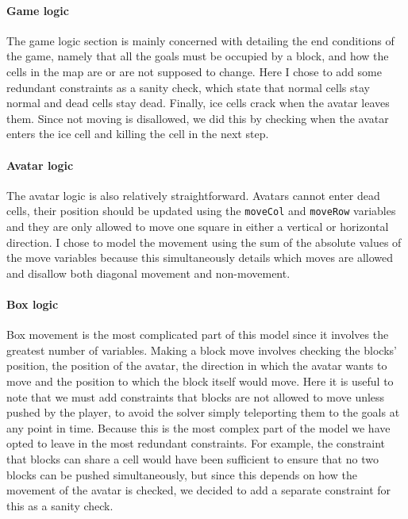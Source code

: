 \documentclass[british]{article}
\newcommand{\code}[1]{\texttt{#1}}
\begin{document}
	\paragraph{Game logic} The game logic section is mainly concerned with detailing the end conditions of the game, namely that all the goals must be occupied by a block, and how the cells in the map are or are not supposed to change. Here I chose to add some redundant constraints  as a sanity check, which state that normal cells stay normal and dead cells stay dead. Finally, ice cells crack when the avatar leaves them. Since not moving is disallowed, we did this by checking when the avatar enters the ice cell and killing the cell in the next step.
	
	\paragraph{Avatar logic} The avatar logic is also relatively straightforward. Avatars cannot enter dead cells, their position should be updated using the \code{moveCol} and \code{moveRow} variables and they are only allowed to move one square in either a vertical or horizontal direction. I chose to model the movement using the sum of the absolute values of the move variables because this simultaneously details which moves are allowed and disallow both diagonal movement and non-movement. 
	
	\paragraph{Box logic} Box movement is the most complicated part of this model since it involves the greatest number of variables. Making a block move involves checking the blocks' position, the position of the avatar, the direction in which the avatar wants to move and the position to which the block itself would move. Here it is useful to note that we must add constraints that blocks are not allowed to move unless pushed by the player, to avoid the solver simply teleporting them to the goals at any point in time. Because this is the most complex part of the model we have opted to leave in the most redundant constraints. For example, the constraint that blocks can share a cell would have been sufficient to ensure that no two blocks can be pushed simultaneously, but since this depends on how the movement of the avatar is checked, we decided to add a separate constraint for this as a sanity check. 
	
	
\end{document}
